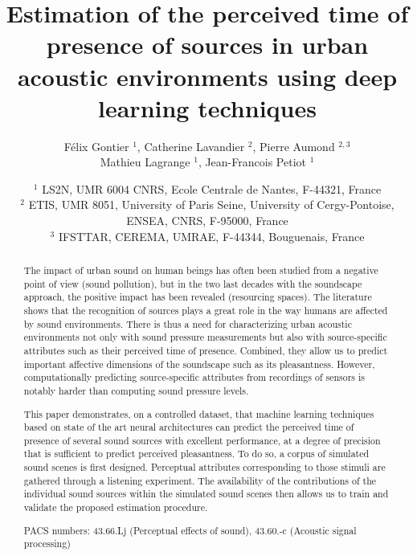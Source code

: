 \documentclass[twocolumn]{article}
\begin{document}
\author{F\'elix Gontier $^1$, Catherine Lavandier $^2$, Pierre Aumond $^{2, 3}$\\Mathieu Lagrange $^1$, Jean-Francois Petiot $^1$}
\date{
$^1$ LS2N, UMR 6004 CNRS, Ecole Centrale de Nantes, F-44321, France\\
$^2$ ETIS, UMR 8051, University of Paris Seine, University of Cergy-Pontoise, ENSEA, CNRS, F-95000, France\\
$^3$ IFSTTAR, CEREMA, UMRAE, F-44344, Bouguenais, France
}
\title{Estimation of the perceived time of presence of sources in urban acoustic environments using deep learning techniques}
\maketitle


\begin{abstract}
The impact of urban sound on human beings has often been studied from a negative point of view (sound pollution), but in the two last decades with the soundscape approach, the positive impact has been revealed (resourcing spaces). The literature shows that the recognition of sources plays a great role in the way humans are affected by sound environments. There is thus a need for characterizing urban acoustic environments not only with sound pressure measurements but also with source-specific attributes such as their perceived time of presence. Combined, they allow us to predict important affective dimensions of the soundscape such as its pleasantness. However, computationally predicting source-specific attributes from recordings of sensors is notably harder than computing sound pressure levels.

This paper demonstrates, on a controlled dataset, that machine learning techniques based on state of the art neural architectures can predict the perceived time of presence of several sound sources with excellent performance, at a degree of precision that is sufficient to predict perceived pleasantness. To do so, a corpus of simulated sound scenes is first designed. Perceptual attributes corresponding to those stimuli are gathered through a listening experiment. The availability of the contributions of the individual sound sources within the simulated sound scenes then allows us to train and validate the proposed estimation procedure.

PACS numbers: 43.66.Lj (Perceptual effects of sound), 43.60.-c (Acoustic signal processing)

\end{abstract}
\end{document}
